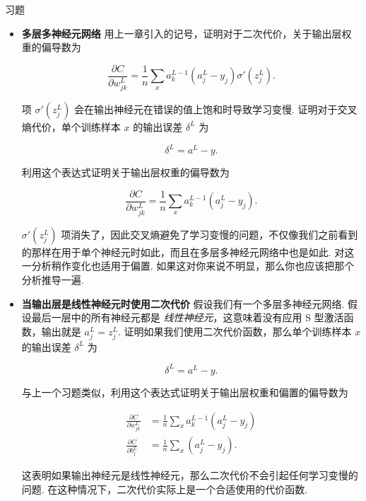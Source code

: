 \begin{exerciseBox}{习题}

\begin{itemize}

\item
\textbf{多层多神经元网络} 用上一章引入的记号，证明对于二次代价，关于输出层权重的偏导数为

\begin{equation}
\frac{\partial C}{\partial w^L_{jk}} = \frac{1}{n} \sum_x a^{L-1}_k (a^L_j-y_j) \sigma'(z^L_j).
\tag{65}
\end{equation}

项 $\sigma'(z^L_j)$ 会在输出神经元在错误的值上饱和时导致学习变慢. 证明对于交叉熵代价，单个训练样本 $x$ 的输出误差 $\delta^L$ 为

\begin{equation}
\delta^L = a^L-y.
\tag{66}
\end{equation}

利用这个表达式证明关于输出层权重的偏导数为

\begin{equation}
\frac{\partial C}{\partial w^L_{jk}} = \frac{1}{n} \sum_x a^{L-1}_k (a^L_j-y_j).
\tag{67}
\end{equation}

$\sigma'(z^L_j)$ 项消失了，因此交叉熵避免了学习变慢的问题，不仅像我们之前看到的那样在用于单个神经元时如此，而且在多层多神经元网络中也是如此. 对这一分析稍作变化也适用于偏置. 如果这对你来说不明显，那么你也应该把那个分析推导一遍.

\item
\textbf{当输出层是线性神经元时使用二次代价} 假设我们有一个多层多神经元网络. 假设最后一层中的所有神经元都是 \emph{线性神经元}，这意味着没有应用 S 型激活函数，输出就是 $a^L_j = z^L_j$. 证明如果我们使用二次代价函数，那么单个训练样本 $x$ 的输出误差 $\delta^L$ 为

\begin{equation}
\delta^L = a^L-y.
\tag{68}
\end{equation}

与上一个习题类似，利用这个表达式证明关于输出层权重和偏置的偏导数为

\begin{align}
\frac{\partial C}{\partial w^L_{jk}} &= \frac{1}{n} \sum_x a^{L-1}_k (a^L_j-y_j) \tag{69} \\ \frac{\partial C}{\partial b^L_{j}} &= \frac{1}{n} \sum_x (a^L_j-y_j). \tag{70}
\end{align}

这表明如果输出神经元是线性神经元，那么二次代价不会引起任何学习变慢的问题. 在这种情况下，二次代价实际上是一个合适使用的代价函数.

\end{itemize}

\end{exerciseBox}

